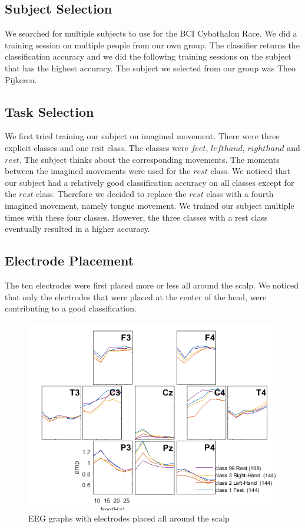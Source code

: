 \documentclass[12pt]{article}
\begin{document}
\subsection{Subject Selection}
We searched for multiple subjects to use for the BCI Cybathalon Race. We did a training session on multiple people from our own group. The classifier returns the classification accuracy and we did the following training sessions on the subject that has the highest accuracy. The subject we selected from our group was Theo Pijkeren. 

\subsection{Task Selection}
We first tried training our subject on imagined movement. There were three explicit classes and one rest class. The classes were $feet$, $left hand$, $right hand$ and $rest$. The subject thinks about the corresponding movements. The moments between the imagined movements were used for the $rest$ class. We noticed that our subject had a relatively good classification accuracy on all classes except for the $rest$ class. Therefore we decided to replace the $rest$ class with a fourth imagined movement, namely tongue movement. We trained our subject multiple times with these four classes. However, the three classes with a rest class eventually resulted in a higher accuracy. 

\subsection{Electrode Placement}
The ten electrodes were first placed more or less all around the scalp. We noticed that only the electrodes that were placed at the center of the head, were contributing to a good classification. 

\begin{figure}[h]
 	\caption{EEG graphs with electrodes placed all around the scalp}
 	\label{fig:eeg1}
 	\includegraphics[scale=0.6,center]{eeg_graphs.png}
\end{figure}
 
\end{document}

